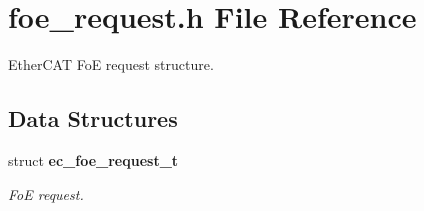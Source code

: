 \section{foe\-\_\-request.\-h File Reference}
\label{foe__request_8h}


Ether\-C\-A\-T Fo\-E request structure.  


\subsection*{Data Structures}
\begin{DoxyCompactItemize}
\item 
struct {\bf ec\-\_\-foe\-\_\-request\-\_\-t}
\begin{DoxyCompactList}\small\item\em Fo\-E request. \end{DoxyCompactList}\end{DoxyCompactItemize}
